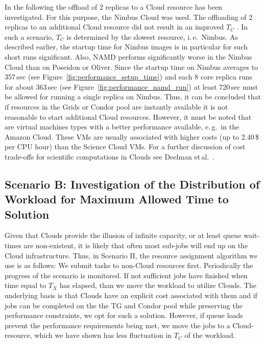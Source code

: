 \documentclass[conference,final]{IEEEtran}
\newcommand{\tmax}{$T_{max}$ }
\newcommand{\tc}{$T_{C}$ }
\begin{document}
In the following the offload of 2 replicas to a Cloud resource has been
investigated. For this purpose, the Nimbus Cloud was used. The offloading of 2 replicas 
to an additional Cloud resource did not result in an 
improved \tc. In such a scenario, \tc is determined by
the slowest resource, i.\,e.\ Nimbus. As described earlier, the
startup time for Nimbus images is in particular for such short runs
significant. Also, NAMD performs significantly worse in the Nimbus
Cloud than on Poseidon or Oliver. Since the startup time on Nimbus
averages to 357\,sec (see Figure~\ref{fig:performance_setup_time}) and
each 8 core replica runs for about 363\,sec (see
Figure~\ref{fig:performance_namd_run}) at least 720\,sec must be
allowed for running a single replica on Nimbus. Thus, it can be
concluded that if resources in the Grids or Condor pool are instantly
available it is not reasonable to start additional Cloud resources.
However, it must be noted that are virtual machines types with a better
performance available, e.\,g.\ in the Amazon Cloud. These VMs 
are usually associated with higher costs (up to 2.40\,\$ per CPU hour) than
the Science Cloud VMs. For a further discussion of cost trade-offs for 
scientific computations in Clouds see Deelman et\,al.~\cite{1413421}. 


\subsection{Scenario B: Investigation of the Distribution of Workload for Maximum Allowed
  Time to Solution} 

Given that Clouds provide the illusion of infinite capacity, or at
least queue wait-times are non-existent, it is likely that often most
sub-jobs will end up on the Cloud infrastructure.  Thus, in Scenario
II, the resource assignment algorithm we use is as follows: We submit
tasks to non-Cloud resources first. Periodically the progress of the
scenario is monitored. If not sufficient jobs have finished
when time equal to $T_{X}$ has elapsed,
than we move the workload to utilize Clouds.  The
underlying basis is that Clouds have an explicit cost associated with
them and if jobs can be completed on the the TG and Condor pool while
preserving the performance constraints, we opt for such a
solution. However, if queue loads prevent the performance requirements
being met, we move the jobs to a Cloud-resource, which we have shown
has less fluctuation in \tc of the workload.
\end{document}
